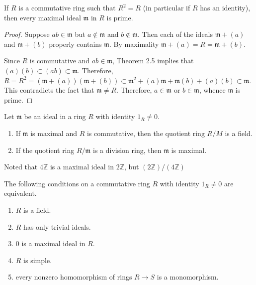 \begin{theorem}
    \label{thm: maximal ideal is prime}
    If $R$ is a commutative ring such that $R^2=R$ (in particular if $R$ has an identity), then every maximal ideal $\mathfrak{m}$ in $R$ is prime.
    \begin{proof}
        Suppose $a b \in \mathfrak{m}$ but $a \notin \mathfrak{m}$ and $b \notin \mathfrak{m}$. Then each of the ideals $\mathfrak{m}+(a)$ and $\mathfrak{m}+(b)$ properly contains $\mathfrak{m}$.
        By maximality $\mathfrak{m}+(a)=R=\mathfrak{m}+(b)$.

        Since $R$ is commutative and $a b \in \mathfrak{m}$, Theorem 2.5 implies that $(a)(b) \subset(a b) \subset \mathfrak{m}$. Therefore, $R=R^2=(\mathfrak{m}+(a))(\mathfrak{m}+(b)) \subset \mathfrak{m}^2+(a) \mathfrak{m}+\mathfrak{m}(b)+(a)(b) \subset \mathfrak{m}$.
        This contradicts the fact that $\mathfrak{m} \neq R$. Therefore, $a \in \mathfrak{m}$ or $b \in \mathfrak{m}$, whence $\mathfrak{m}$ is prime.
    \end{proof}
\end{theorem}


\begin{theorem}
    \label{thm: maximal ideal}
    Let $\mathfrak{m}$ be an ideal in a ring $R$ with identity $1_R \neq 0$.
    \begin{enumerate}
        \item
              If $\mathfrak{m}$ is maximal and $R$ is commutative, then the quotient ring $R / M$ is a field.

        \item
              If the quotient ring $R / \mathfrak{m}$ is a division ring, then $\mathfrak{m}$ is maximal.
    \end{enumerate}
    \begin{remark}
        Noted that $4\mathbb{Z}$ is a maximal ideal in $2\mathbb{Z}$, but $\left(2\mathbb{Z}\right)/\left(4\mathbb{Z}\right)$
    \end{remark}
\end{theorem}

\begin{corollary}
    \label{cor: equivalent conditions of field}
    The following conditions on a commutative ring $R$ with identity $1_R \neq 0$ are equivalent.
    \begin{enumerate}
        \item
              $R$ is a field.

        \item
              $R$ has only trivial ideals.

        \item
              $0$ is a maximal ideal in $R$.

        \item
              $R$ is simple.
        \item
              every nonzero homomorphism of rings $R \rightarrow {S}$ is a monomorphism.
    \end{enumerate}
\end{corollary}



